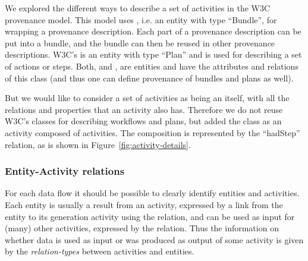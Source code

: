 

We explored the different ways to describe a set of activities in the W3C 
provenance model. This model uses , i.e. an entity with type ``Bundle'', 
for wrapping a provenance description. Each part of a provenance description can be 
put into a bundle, and the bundle can then be reused in other provenance descriptions. 
W3C's  is an entity with type ``Plan'' and is used for describing a 
set of actions or steps. Both,  and , are entities and 
have the attributes and relations of this class (and thus one can define provenance of bundles and plans as well).

But we would like to consider a set of activities as being an  itself, 
with all the relations and properties that an activity also has. Therefore we do not reuse
W3C's classes for describing workflows and plans, but added 
the class  as an activity composed of activities. The composition is represented by 
the ``hadStep'' relation, as is shown in Figure~\ref{fig:activity-details}.

%



\subsubsection{Entity-Activity relations}\label{sec:entity-activity-relations}

For each data flow it should be possible to clearly identify entities and 
activities. 
Each entity is usually a result from an activity, expressed by a link from 
the entity to its generation activity using the  relation,
and can be used as input for (many) other activities, expressed by the  relation.
Thus the information on whether data is used as input or was produced as output of 
some activity is given by the \emph{relation-types} between activities and entities.

